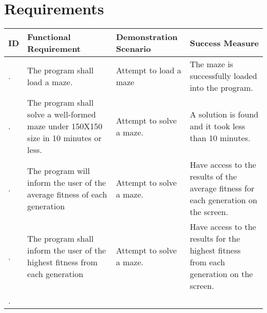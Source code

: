 \documentclass[letterpaper, 12pt]{article}
\newcounter{requirement}
\begin{document}
\newcommand{\req}{%
  \stepcounter{requirement}
  \arabic{requirement}.}
\section{Requirements}
  \begin{tabularx}{\textwidth}{l X X X}
  \toprule\textbf{ID} & \textbf{Functional Requirement} & \textbf{Demonstration Scenario} & \textbf{Success Measure}\\ \midrule 
	 \req{} & The program shall load a maze. & Attempt to load a maze & The maze is successfully loaded into the program. \\
	 \req{} & The program shall solve a well-formed maze under 150X150 size in 10 minutes or less. & Attempt to solve a maze. & A solution is found and it took less than 10 minutes. \\
	 \req{} & The program will inform the user of the average fitness of each generation & Attempt to solve a maze. & Have access to the results of the average fitness for each generation on the screen. \\
	 \req{} & The program shall inform the user of the highest fitness from each generation & Attempt to solve a maze. & Have access to the results for the highest fitness from each generation on the screen. \\
	 \req{} & 
  \bottomrule
	\end{tabularx}
  
\end{document}
